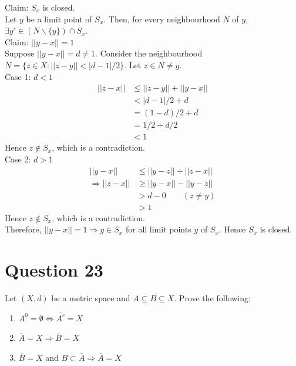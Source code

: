 \documentclass{article}
\begin{document}
	Claim: $S_x$ is closed. \\
	Let $y$ be a limit point of $S_x$.
	Then, for every neighbourhood $N$ of $y$, $\exists y' \in (N \backslash \{y\}) \cap S_x$. \\
	Claim: $||y - x|| = 1$ \\
	Suppose $||y - x|| = d \ne 1$.
	Consider the neighbourhood $N = \{z \in X: ||z - y|| < |d - 1| / 2\}$.
	Let $z \in N \ne y$. \\
	Case 1: $d < 1$ \\
	\begin{align*}
		||z - x|| &\le ||z - y|| + ||y - x|| \\
		&< |d - 1| / 2 + d \\
		&= (1 - d) / 2 + d \\
		&= 1 / 2 + d / 2 \\
		&< 1
	\end{align*}
	Hence $z \notin S_x$, which is a contradiction. \\
	Case 2: $d > 1$ \\
	\begin{align*}
		||y - x|| &\le ||y - z|| + ||z - x|| \\
		\Rightarrow ||z - x|| &\ge ||y - x|| - ||y - z|| \\
		&> d - 0 \qquad (z \ne y) \\
		&> 1
	\end{align*}
	Hence $z \notin S_x$, which is a contradiction. \\

	Therefore, $||y - x|| = 1 \Rightarrow y \in S_x$ for all limit points $y$ of $S_x$.
	Hence $S_x$ is closed.

\section{Question 23}

	Let $(X, d)$ be a metric space and $A \subseteq B \subseteq X$.
	Prove the following:

	\begin{enumerate}[label=(\alph*)]
		\item $A^0 = \emptyset \Leftrightarrow \overline{A^c} = X$
		\item $\overline{A} = X \Rightarrow \overline{B} = X$
		\item $\overline{B} = X$ and $B \subset \overline{A} \Rightarrow \overline{A} = X$
	\end{enumerate}
\end{document}
